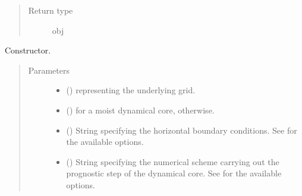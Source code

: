 \documentclass[letterpaper,10pt,english]{sphinxmanual}
\begin{document}
\begin{fulllineitems}
\begin{fulllineitems}
\begin{quote}
\begin{description}
\item[{Return type}] \leavevmode
obj

\end{description}\end{quote}

\end{fulllineitems}


\begin{fulllineitems}
\label{\detokenize{api:dycore.dycore_isentropic.DynamicalCoreIsentropic.__init__}}
Constructor.
\begin{quote}\begin{description}
\item[{Parameters}] \leavevmode\begin{itemize}
\item {} 
 () \textendash{} {\hyperref[\detokenize{api:grids.grid_xyz.GridXYZ}]{}} representing the underlying grid.

\item {} 
 () \textendash{}  for a moist dynamical core,  otherwise.

\item {} 
 () \textendash{} String specifying the horizontal boundary conditions.
See {\hyperref[\detokenize{api:dycore.horizontal_boundary.HorizontalBoundary}]{}} for the available options.

\item {} 
 () \textendash{} String specifying the numerical scheme carrying out the prognostic step of the dynamical core.
See {\hyperref[\detokenize{api:dycore.prognostic_isentropic.PrognosticIsentropic}]{}} for the available options.


\end{itemize}
\end{description}
\end{quote}
\end{fulllineitems}
\end{fulllineitems}
\end{document}
